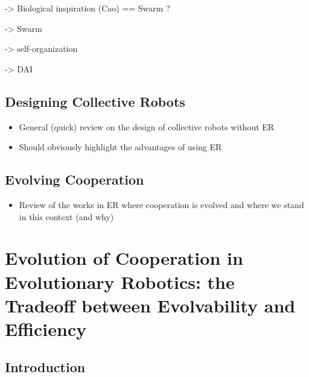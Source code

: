     -> Biological inspiration (Cao) == Swarm ?

    -> Swarm

    -> self-organization

    -> DAI



  \subsection{Designing Collective Robots}
    \begin{itemize}
      \item{General (quick) review on the design of collective robots without ER}
      \item{Should obviously highlight the advantages of using ER}
    \end{itemize}

  \subsection{Evolving Cooperation}
    \begin{itemize}
      \item{Review of the works in ER where cooperation is evolved and where we stand in this context (and why)}
    \end{itemize}












































\section{Evolution of Cooperation in Evolutionary Robotics: the Tradeoff between Evolvability and Efficiency}

  \subsection{Introduction}

